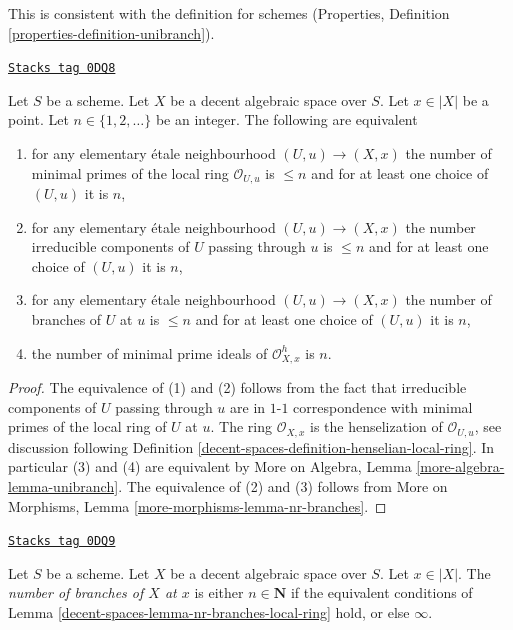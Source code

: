 This is consistent with the definition for schemes
(Properties, Definition \ref{properties-definition-unibranch}).

\begin{lemma}
\label{decent-spaces-lemma-nr-branches-local-ring}
\href{https://stacks.math.columbia.edu/tag/0DQ8}{\texttt{Stacks tag 0DQ8}}

Let $S$ be a scheme. Let $X$ be a decent algebraic space over $S$.
Let $x \in |X|$ be a point. Let $n \in \{1, 2, \ldots\}$ be an integer.
The following are equivalent
\begin{enumerate}
\item for any elementary \'etale neighbourhood $(U, u) \to (X, x)$
the number of minimal primes of the local ring $\mathcal{O}_{U, u}$
is $\leq n$ and for at least one choice of $(U, u)$ it is $n$,
\item for any elementary \'etale neighbourhood $(U, u) \to (X, x)$
the number irreducible components of $U$ passing through $u$ is $\leq n$
and for at least one choice of $(U, u)$ it is $n$,
\item for any elementary \'etale neighbourhood $(U, u) \to (X, x)$
the number of branches of $U$ at $u$ is $\leq n$
and for at least one choice of $(U, u)$ it is $n$,
\item the number of minimal prime ideals of
$\mathcal{O}_{X, x}^h$ is $n$.
\end{enumerate}
\end{lemma}

\begin{proof}
The equivalence of (1) and (2) follows from the fact that irreducible
components of $U$ passing through $u$ are in $1$-$1$ correspondence with
minimal primes of the local ring of $U$ at $u$.
The ring $\mathcal{O}_{X, x}$ is the henselization of $\mathcal{O}_{U, u}$, see
discussion following Definition \ref{decent-spaces-definition-henselian-local-ring}.
In particular (3) and (4) are equivalent by
More on Algebra, Lemma \ref{more-algebra-lemma-unibranch}.
The equivalence of (2) and (3) follows from
More on Morphisms, Lemma \ref{more-morphisms-lemma-nr-branches}.
\end{proof}

\begin{definition}
\label{decent-spaces-definition-number-of-branches}
\href{https://stacks.math.columbia.edu/tag/0DQ9}{\texttt{Stacks tag 0DQ9}}

Let $S$ be a scheme. Let $X$ be a decent algebraic space over $S$.
Let $x \in |X|$. The {\it number of branches of $X$ at $x$} is
either $n \in \mathbf{N}$ if the equivalent conditions
of Lemma \ref{decent-spaces-lemma-nr-branches-local-ring}
hold, or else $\infty$.
\end{definition}

